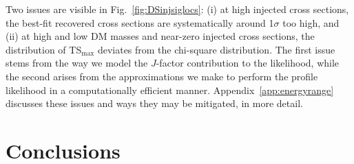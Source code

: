 Two issues are visible in Fig.~\ref{fig:DSinjsiglocs}: (i) at high injected cross sections, the best-fit recovered cross sections are systematically around 1$\sigma$ too high, and (ii) at high and low DM masses and near-zero injected cross sections, the distribution of TS$_\text{max}$ deviates from the chi-square distribution.  The first issue stems from the way we model the $J$-factor contribution to the likelihood, while the second arises from the approximations we make to perform the profile likelihood in a computationally efficient manner.  Appendix~\ref{app:energyrange} discusses these issues and ways they may be mitigated, in more detail.

\section{Conclusions}
\label{sec:conclusions}

